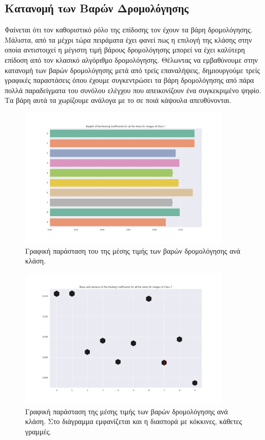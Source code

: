 \subsection{Κατανομή των Βαρών Δρομολόγησης}
Φαίνεται ότι τον καθοριστικό ρόλο της επίδοσης τον έχουν τα βάρη δρομολόγησης. Μάλιστα, από τα μέχρι τώρα πειράματα έχει φανεί πως η επιλογή της κλάσης στην οποία αντιστοιχεί η μέγιστη τιμή βάρους δρομολόγησης μπορεί να έχει καλύτερη επίδοση από τον κλασικό αλγόριθμο δρομολόγησης. Θέλωντας να εμβαθύνουμε στην κατανομή των βαρών δρομολόγησης μετά από τρείς επαναλήψεις, δημιουργούμε τρείς γραφικές παραστάσεις όπου έχουμε συγκεντρώσει τα βάρη δρομολόγησης από πάρα πολλά παραδείγματα του συνόλου ελέγχου που απεικονίζουν ένα συγκεκριμένο ψηφίο. Τα βάρη αυτά τα χωρίζουμε ανάλογα με το σε ποιά κάψουλα  απευθύνονται.\par
\begin{figure}[h]
    \centering
    \includegraphics[width=0.9\textwidth]{images/chapter experiments/method 1/image 13/barplot_for_class_7.png}
    \caption{Γραφική παράσταση του της μέσης τιμής των βαρών δρομολόγησης ανά κλάση.}
    \label{fig:exp_method_1_special_weight_dist_1}
  \end{figure}

\begin{figure}[h]
    \centering
    \includegraphics[width=0.9\textwidth]{images/chapter experiments/method 1/image 13/mean_var_for_class_7.png}
    \caption{Γραφική παράσταση της μέσης τιμής των βαρών δρομολόγησης ανά κλάση. Στο διάγραμμα εμφανίζεται και η διασπορά με κόκκινες, κάθετες γραμμές.}
    \label{fig:exp_method_1_special_weight_dist_2}
  \end{figure}

